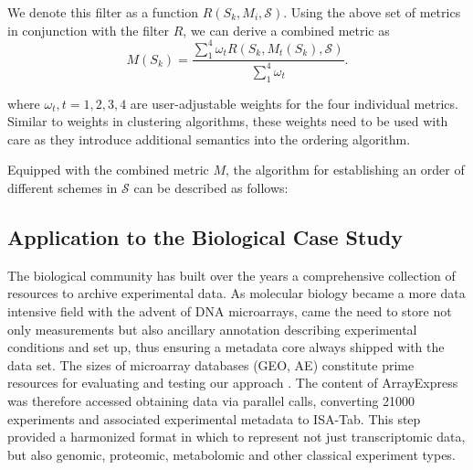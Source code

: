 We denote this filter as a function $R(S_k, M_i, \mathcal{S})$. Using the above set of metrics in conjunction with the filter $R$, we can derive a combined metric as
\[
  M(S_k) = \frac{\sum_1^4 \omega_t R(S_k, M_t(S_k), \mathcal{S})}{\sum_1^4 \omega_t}.
\]

\noindent where $\omega_t, t=1,2,3,4$ are user-adjustable weights for the four individual metrics. Similar to weights in clustering algorithms, these weights need to be used with care as they introduce additional semantics into the ordering algorithm. 

Equipped with the combined metric $M$, the algorithm for establishing an order of different schemes in $\mathcal{S}$ can be described as follows:




\subsection{Application to the Biological Case Study}
%
The biological community has built over the years a comprehensive collection of resources to archive experimental data. As molecular biology became a more data intensive field with the advent of DNA microarrays, came the need to store not only measurements but also ancillary annotation describing experimental conditions and set up, thus ensuring a metadata core always shipped with the data set. The sizes of microarray databases (GEO, AE) constitute prime resources for evaluating and testing our approach \cite{edgar02,parkinson11}. The content of ArrayExpress was therefore accessed obtaining data via parallel calls, converting 21000 experiments and associated experimental metadata to ISA-Tab\cite{rocca-serra10,sansone12}. This step provided a harmonized format in which to represent not just transcriptomic data, but also genomic, proteomic, metabolomic and other classical experiment types.

